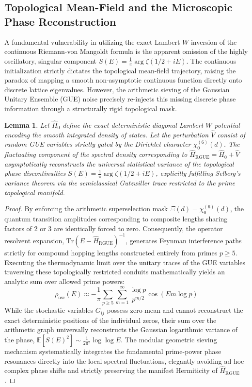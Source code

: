 \documentclass[aps,prl,preprint,superscriptaddress,floatfix]{revtex4-2}
\newtheorem{lemma}[theorem]{Lemma}
\begin{document}
\subsection{Topological Mean-Field and the Microscopic Phase Reconstruction}

A fundamental vulnerability in utilizing the exact Lambert $W$ inversion of the continuous Riemann-von Mangoldt formula is the apparent omission of the highly oscillatory, singular component $S(E) = \frac{1}{\pi} \arg \zeta(1/2+iE)$. The continuous initialization strictly dictates the topological mean-field trajectory, raising the paradox of mapping a smooth non-asymptotic continuous function directly onto discrete lattice eigenvalues. However, the arithmetic sieving of the Gaussian Unitary Ensemble (GUE) noise precisely re-injects this missing discrete phase information through a structurally rigid topological mask.

\begin{lemma}
\label{lemma:phase_absorption_formal_gutzwiller}
Let $\hat{H}_0$ define the exact deterministic diagonal Lambert $W$ potential encoding the smooth integrated density of states. Let the perturbation $\hat{V}$ consist of random GUE variables strictly gated by the Dirichlet character $\chi_0^{(6)}(d)$. The fluctuating component of the spectral density corresponding to $\hat{H}_{\text{RGUE}} = \hat{H}_0 + \hat{V}$ asymptotically reconstructs the universal statistical variance of the topological phase discontinuities $S(E) = \frac{1}{\pi} \arg \zeta(1/2+iE)$, explicitly fulfilling Selberg's variance theorem via the semiclassical Gutzwiller trace restricted to the prime topological manifold.
\end{lemma}

\begin{proof}
By enforcing the arithmetic superselection mask $\Xi(d) = \chi_0^{(6)}(d)$, the quantum transition amplitudes corresponding to composite lengths sharing factors of 2 or 3 are identically forced to zero. Consequently, the operator resolvent expansion, $\text{Tr}(E - \hat{H}_{\text{RGUE}})^{-1}$, generates Feynman interference paths strictly for compound hopping lengths constructed entirely from primes $p \ge 5$. Executing the thermodynamic limit over the unitary traces of the GUE variables traversing these topologically restricted conduits mathematically yields an analytic sum over allowed prime powers:
\begin{equation}
\rho_{\text{osc}}(E) \approx -\frac{1}{\pi} \sum_{p \ge 5} \sum_{m=1}^{\infty} \frac{\log p}{p^{m/2}} \cos(E m \log p)
\end{equation}
While the stochastic variables $G_{ij}$ possess zero mean and cannot reconstruct the exact deterministic positions of the individual zeros, their sum over the arithmetic graph universally reconstructs the Gaussian logarithmic variance of the phase, $\mathbb{E}[S(E)^2] \sim \frac{1}{2\pi^2} \log \log E$. The modular geometric sieving mechanism systematically integrates the fundamental prime-power phase resonances directly into the local spectral fluctuations, elegantly avoiding ad-hoc complex phase shifts and strictly preserving the manifest Hermiticity of $\hat{H}_{\text{RGUE}}$.
\end{proof}
\end{document}
